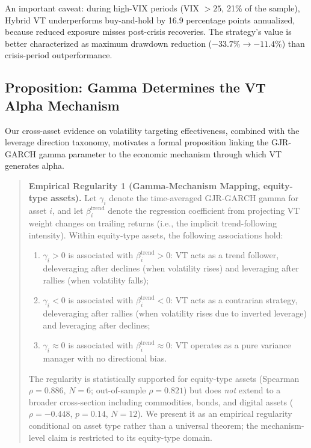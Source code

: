 An important caveat: during high-VIX periods (VIX $> 25$, 21\% of the sample), Hybrid VT underperforms buy-and-hold by 16.9 percentage points annualized, because reduced exposure misses post-crisis recoveries. The strategy's value is better characterized as maximum drawdown reduction ($-33.7\% \to -11.4\%$) than crisis-period outperformance.

\subsection{Proposition: Gamma Determines the VT Alpha Mechanism}
\label{sec:gamma-mechanism}

Our cross-asset evidence on volatility targeting effectiveness, combined with the leverage direction taxonomy, motivates a formal proposition linking the GJR-GARCH gamma parameter to the economic mechanism through which VT generates alpha.

\begin{quote}
\textbf{Empirical Regularity 1 (Gamma-Mechanism Mapping, equity-type assets).}
Let $\gamma_i$ denote the time-averaged GJR-GARCH gamma for asset $i$, and let $\beta^{\text{trend}}_i$ denote the regression coefficient from projecting VT weight changes on trailing returns (i.e., the implicit trend-following intensity). Within equity-type assets, the following associations hold:
\begin{enumerate}
\item[(i)] $\gamma_i > 0$ is associated with $\beta^{\text{trend}}_i > 0$: VT acts as a trend follower, deleveraging after declines (when volatility rises) and leveraging after rallies (when volatility falls);
\item[(ii)] $\gamma_i < 0$ is associated with $\beta^{\text{trend}}_i < 0$: VT acts as a contrarian strategy, deleveraging after rallies (when volatility rises due to inverted leverage) and leveraging after declines;
\item[(iii)] $\gamma_i \approx 0$ is associated with $\beta^{\text{trend}}_i \approx 0$: VT operates as a pure variance manager with no directional bias.
\end{enumerate}
The regularity is statistically supported for equity-type assets (Spearman $\rho = 0.886$, $N = 6$; out-of-sample $\rho = 0.821$) but does \emph{not} extend to a broader cross-section including commodities, bonds, and digital assets ($\rho = -0.448$, $p = 0.14$, $N = 12$). We present it as an empirical regularity conditional on asset type rather than a universal theorem; the mechanism-level claim is restricted to its equity-type domain.\end{quote}

